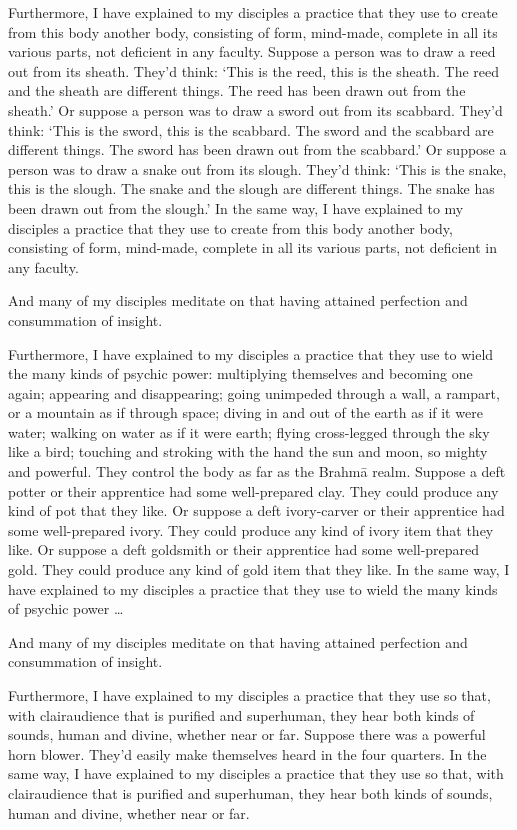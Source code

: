\documentclass[12pt,openany]{book}%
\begin{document}
Furthermore, I have explained to my disciples a practice that they use to create from this body another body, consisting of form, mind-made, complete in all its various parts, not deficient in any faculty. Suppose a person was to draw a reed out from its sheath. They’d think: ‘This is the reed, this is the sheath. The reed and the sheath are different things. The reed has been drawn out from the sheath.’ Or suppose a person was to draw a sword out from its scabbard. They’d think: ‘This is the sword, this is the scabbard. The sword and the scabbard are different things. The sword has been drawn out from the scabbard.’ Or suppose a person was to draw a snake out from its slough. They’d think: ‘This is the snake, this is the slough. The snake and the slough are different things. The snake has been drawn out from the slough.’ In the same way, I have explained to my disciples a practice that they use to create from this body another body, consisting of form, mind-made, complete in all its various parts, not deficient in any faculty. 

And many of my disciples meditate on that having attained perfection and consummation of insight. 

Furthermore, I have explained to my disciples a practice that they use to wield the many kinds of psychic power: multiplying themselves and becoming one again; appearing and disappearing; going unimpeded through a wall, a rampart, or a mountain as if through space; diving in and out of the earth as if it were water; walking on water as if it were earth; flying cross-legged through the sky like a bird; touching and stroking with the hand the sun and moon, so mighty and powerful. They control the body as far as the \textsanskrit{Brahmā} realm. Suppose a deft potter or their apprentice had some well-prepared clay. They could produce any kind of pot that they like. Or suppose a deft ivory-carver or their apprentice had some well-prepared ivory. They could produce any kind of ivory item that they like. Or suppose a deft goldsmith or their apprentice had some well-prepared gold. They could produce any kind of gold item that they like. In the same way, I have explained to my disciples a practice that they use to wield the many kinds of psychic power … 

And many of my disciples meditate on that having attained perfection and consummation of insight. 

Furthermore, I have explained to my disciples a practice that they use so that, with clairaudience that is purified and superhuman, they hear both kinds of sounds, human and divine, whether near or far. Suppose there was a powerful horn blower. They’d easily make themselves heard in the four quarters. In the same way, I have explained to my disciples a practice that they use so that, with clairaudience that is purified and superhuman, they hear both kinds of sounds, human and divine, whether near or far. 
\end{document}
